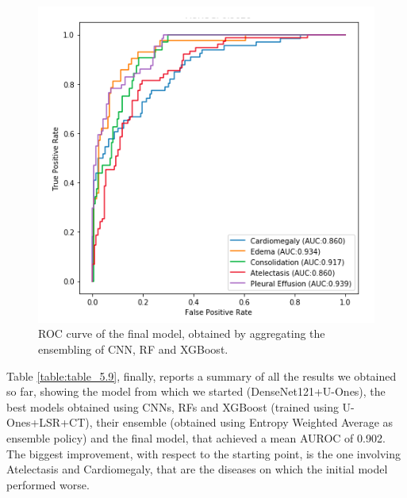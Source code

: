 \begin{figure}[h!]
    \centering
    \includegraphics[scale=0.55]{Tesi/images/Results/Final Model.png}
    \caption[Final model ROC]{ROC curve of the final model, obtained by aggregating the ensembling of CNN, RF and XGBoost.}
    \label{fig:figure_5.13}
\end{figure}


Table \ref{table:table_5.9}, finally, reports a summary of all the results we obtained so far, showing the model from which we started (DenseNet121+U-Ones), the best models obtained using CNNs, RFs and XGBoost (trained using U-Ones+LSR+CT), their ensemble (obtained using Entropy Weighted Average as ensemble policy) and the final model, that achieved a mean AUROC of 0.902. The biggest improvement, with respect to the starting point, is the one involving Atelectasis and Cardiomegaly, that are the diseases on which the initial model performed worse. 

